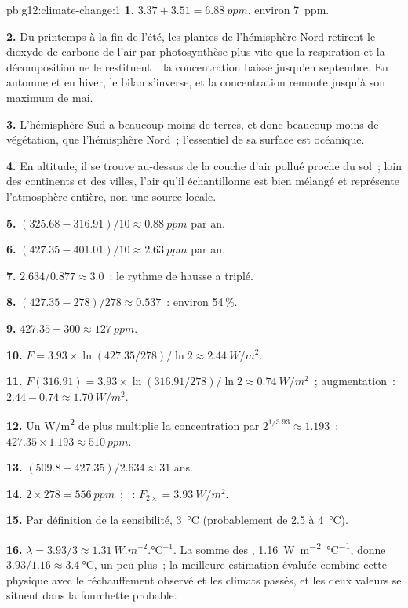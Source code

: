 \begin{solution}{pb:g12:climate-change:1}
\textbf{1.} $3.37 + 3.51 = \qty{6.88}{ppm}$, environ \qty{7}{ppm}.

\textbf{2.} Du printemps à la fin de l'été, les plantes de l'hémisphère
Nord retirent le dioxyde de carbone de l'air par photosynthèse plus vite
que la respiration et la décomposition ne le restituent~: la concentration
baisse jusqu'en septembre. En automne et en hiver, le bilan s'inverse, et
la concentration remonte jusqu'à son maximum de mai.

\textbf{3.} L'hémisphère Sud a beaucoup moins de terres, et donc beaucoup
moins de végétation, que l'hémisphère Nord~; l'essentiel de sa surface est
océanique.

\textbf{4.} En altitude, il se trouve au-dessus de la couche d'air pollué
proche du sol~; loin des continents et des villes, l'air qu'il
échantillonne est bien mélangé et représente l'atmosphère entière, non une
source locale.

\textbf{5.} $(325.68 - 316.91)/10 \approx \qty{0.88}{ppm}$ par an.

\textbf{6.} $(427.35 - 401.01)/10 \approx \qty{2.63}{ppm}$ par an.

\textbf{7.} $2.634/0.877 \approx 3.0$~: le rythme de hausse a triplé.

\textbf{8.} $(427.35 - 278)/278 \approx 0.537$~: environ 54\,\%.

\textbf{9.} $427.35 - 300 \approx \qty{127}{ppm}$.

\textbf{10.} $F = 3.93 \times \ln(427.35/278)/\ln 2 \approx
\qty{2.44}{W/m^2}$.

\textbf{11.} $F(316.91) = 3.93 \times \ln(316.91/278)/\ln 2 \approx
\qty{0.74}{W/m^2}$~; augmentation~: $2.44 - 0.74 \approx \qty{1.70}{W/m^2}$.

\textbf{12.} Un \unit{W/m^2} de plus multiplie la concentration par
$2^{1/3.93} \approx 1.193$~: $427.35 \times 1.193 \approx \qty{510}{ppm}$.

\textbf{13.} $(509.8 - 427.35)/2.634 \approx 31$ ans.

\textbf{14.} $2 \times 278 = \qty{556}{ppm}$~; ~: $F_{2\times} =
\qty{3.93}{W/m^2}$.

\textbf{15.} Par définition de la sensibilité, \qty{3}{\degreeCelsius}
(probablement de 2.5 à \qty{4}{\degreeCelsius}).

\textbf{16.} $\lambda = 3.93/3 \approx \qty{1.31}{W.m^{-2}.\degreeCelsius^{-1}}$.
La somme des , \qty{1.16}{W.m^{-2}.\degreeCelsius^{-1}}, donne
$3.93/1.16 \approx \qty{3.4}{\degreeCelsius}$, un peu plus~; la meilleure
estimation évaluée combine cette physique avec le réchauffement observé et
les climats passés, et les deux valeurs se situent dans la fourchette
probable.


\end{solution}
